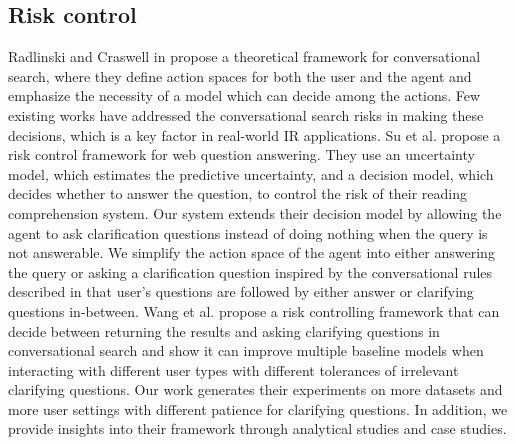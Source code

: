 \documentclass[format=acmsmall, review=False, screen=true]{acmart}
\begin{document}
\subsection{\textbf{Risk control}}
Radlinski and Craswell in \cite{framework2017} propose a theoretical framework for conversational search, where they define action spaces for both the user and the agent and emphasize the necessity of a model which can decide among the actions. Few existing works have addressed the conversational search risks in making these decisions, which is a key factor in real-world IR applications. Su et al. \cite{surisk} propose a risk control framework for web question answering. They use an uncertainty model, which estimates the predictive uncertainty, and a decision model, which decides whether to answer the question, to control the risk of their reading comprehension system. Our system extends their decision model by allowing the agent to ask clarification questions instead of doing nothing when the query is not answerable. We simplify the action space of the agent into either answering the query or asking a clarification question inspired by the conversational rules described in \cite{emanuel1968sequencing} that user's questions are followed by either answer or clarifying questions in-between. Wang et al. \cite{wang2021controlling} propose a risk controlling framework that can decide between returning the results and asking clarifying questions in conversational search and show it can improve multiple baseline models when interacting with different user types with different tolerances of irrelevant clarifying questions. Our work generates their experiments on more datasets and more user settings with different patience for clarifying questions. In addition, we provide insights into their framework through analytical studies and case studies.
\end{document}

